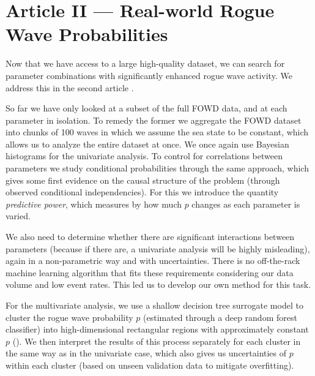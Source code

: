 
\cleardoublepage
\section{Article II --- Real-world Rogue Wave Probabilities} \label{sec:rogueprob}

%
Now that we have access to a large high-quality dataset, we can search for parameter combinations with significantly enhanced rogue wave activity. We address this in the second article \citep{hafner_real-world_2021}.

So far we have only looked at a subset of the full FOWD data, and at each parameter in isolation. To remedy the former we aggregate the FOWD dataset into chunks of 100 waves in which we assume the sea state to be constant, which allows us to analyze the entire dataset at once. We once again use Bayesian histograms for the univariate analysis. To control for correlations between parameters we study conditional probabilities through the same approach, which gives some first evidence on the causal structure of the problem (through observed conditional independencies). For this we introduce the quantity \emph{predictive power}, which measures by how much $p$ changes as each parameter is varied.

We also need to determine whether there are significant interactions between parameters (because if there are, a univariate analysis will be highly misleading), again in a non-parametric way and with uncertainties. There is no off-the-rack machine learning algorithm that fits these requirements considering our data volume and low event rates. This led us to develop our own method for this task.

For the multivariate analysis, we use a shallow decision tree surrogate model to cluster the rogue wave probability $p$ (estimated through a deep random forest classifier) into high-dimensional rectangular regions with approximately constant $p$ (). We then interpret the results of this process separately for each cluster in the same way as in the univariate case, which also gives us uncertainties of $p$ within each cluster (based on unseen validation data to mitigate overfitting).

